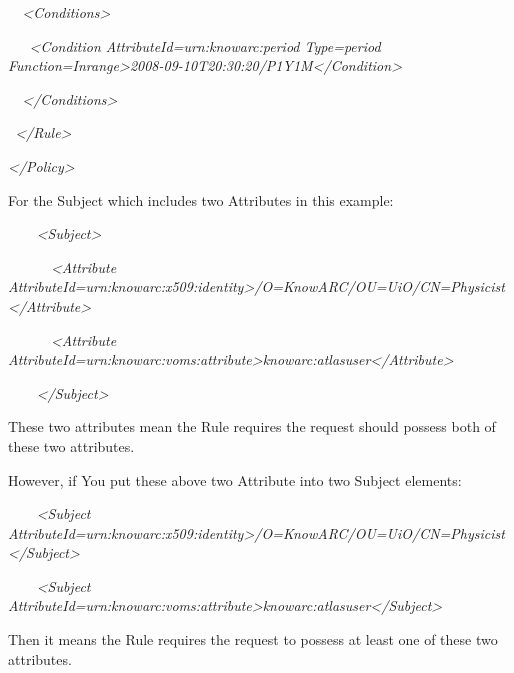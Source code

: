 \documentclass{article}
\begin{document}
{\itshape\color{black}
\ \ {\textless}Conditions{\textgreater}}

{\itshape\color{black}
\ \ \ {\textless}Condition
AttributeId={\textquotedbl}urn:knowarc:period{\textquotedbl}
Type={\textquotedbl}period{\textquotedbl}
Function={\textquotedbl}Inrange{\textquotedbl}{\textgreater}2008-09-10T20:30:20/P1Y1M{\textless}/Condition{\textgreater}}

{\itshape\color{black}
\ \ {\textless}/Conditions{\textgreater}}

{\itshape\color{black}
\ {\textless}/Rule{\textgreater}}

{\itshape\color{black}
{\textless}/Policy{\textgreater}}

{\color{black}
For the Subject which includes two Attributes in this example:}

{\itshape\color{black}
\ \ \ \ {\textless}Subject{\textgreater}}

{\itshape\color{black}
\ \ \ \ \ \ {\textless}Attribute
AttributeId={\textquotedbl}urn:knowarc:x509:identity{\textquotedbl}{\textgreater}/O=KnowARC/OU=UiO/CN=Physicist{\textless}/Attribute{\textgreater}}

{\itshape\color{black}
\ \ \ \ \ \ {\textless}Attribute
AttributeId={\textquotedbl}urn:knowarc:voms:attribute{\textgreater}knowarc:atlasuser{\textless}/Attribute{\textgreater}}

{\itshape\color{black}
\ \ \ \ {\textless}/Subject{\textgreater}}

{\color{black}
These two attributes mean the Rule requires the request should possess
both of these two attributes.}

{\color{black}
However, if You put these above two Attribute into two Subject
elements:}

{\itshape\color{black}
\ \ \ \ {\textless}Subject
AttributeId={\textquotedbl}urn:knowarc:x509:identity{\textquotedbl}{\textgreater}/O=KnowARC/OU=UiO/CN=Physicist{\textless}/Subject{\textgreater}}

{\itshape\color{black}
\ \ \ \ {\textless}Subject
AttributeId={\textquotedbl}urn:knowarc:voms:attribute{\textgreater}knowarc:atlasuser{\textless}/Subject{\textgreater}}

{\color{black}
Then it means the Rule requires the request to possess at least one of
these two attributes.}
\end{document}

